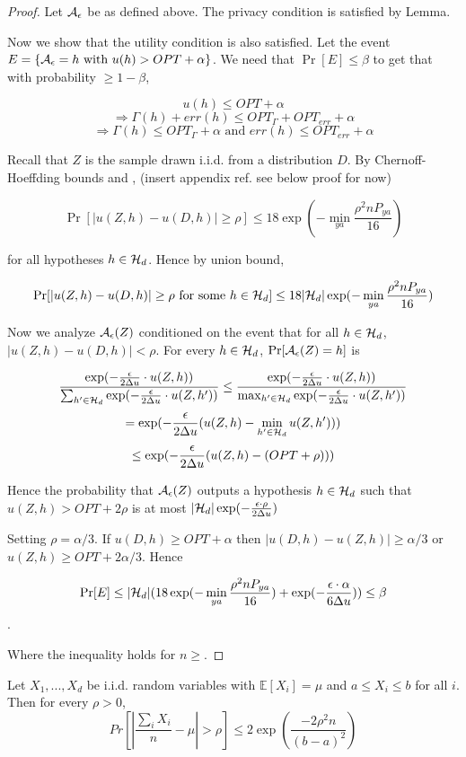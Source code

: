 \begin{proof}
	Let $\mathcal{A}_{\epsilon}$ be as defined above. The privacy condition is
	satisfied by Lemma.

	Now we show that the utility condition is also satisfied. Let the
	event $E = \{\mathcal{A}_{\epsilon} = h \text{ with } u(h) > OPT + \alpha\}$.
	We need that $\Pr[E] \leq \beta$ to get that with probability $\geq 1-\beta$,

	$$u(h) \leq OPT + \alpha$$
	$$\Rightarrow \Gamma(h) + err(h) \leq OPT_\Gamma + OPT_{err} +\alpha$$
	$$\Rightarrow \Gamma(h) \leq OPT_\Gamma +\alpha \text{ and } err(h) \leq OPT_{err} +\alpha$$

	Recall that $Z$ is the sample drawn i.i.d. from a distribution $D$.
	By Chernoff-Hoeffding bounds and \cite{woodworthFollowUp}, (insert appendix ref. see below proof
	for now)

	$$\Pr[|u(Z,h) - u(D,h)| \geq \rho] \leq 18\exp(-\min_{ya}{\frac{\rho^2 n P_{ya}}{16}})$$

	for all hypotheses $h \in \mathcal{H}_d$. Hence by union bound,

	$$\Pr[|u(Z,h) - u(D,h)| \geq \rho \text{ for some } h \in \mathcal{H}_d] \leq 18|\mathcal{H}_d|\exp(-\min_{ya}{\frac{\rho^2 n P_{ya}}{16}})$$

	Now we analyze $\mathcal{A}_\epsilon(Z)$ conditioned on the event that for all
	$h\in \mathcal{H}_d$, $|u(Z,h) - u(D,h)| < \rho$. For every $h \in \mathcal{H}_d$, $\Pr[\mathcal{A}_\epsilon(Z) = h]$ is

	$$\frac{\exp(-\frac{\epsilon}{2\Delta u} \cdot
		u(Z,h))}{\sum_{h'\in\mathcal{H}_d}\exp(-\frac{\epsilon}{2\Delta u} \cdot u(Z,h'))}
	\leq \frac{\exp(-\frac{\epsilon}{2\Delta u} \cdot
		u(Z,h))}{\max_{h'\in\mathcal{H}_d}\exp(-\frac{\epsilon}{2\Delta u} \cdot u(Z,h'))} $$
	$$= \exp(-\frac{\epsilon}{2\Delta u}(u(Z,h) - \min_{h'\in\mathcal{H}_d}u(Z,h')))$$
	$$\leq \exp(-\frac{\epsilon}{2\Delta u}(u(Z,h) - (OPT + \rho)))$$

	Hence the probability that $\mathcal{A}_\epsilon(Z)$ outputs a hypothesis $h \in
	\mathcal{H}_d$ such that $u(Z,h) > OPT + 2\rho$ is at most
	$|\mathcal{H}_d|\exp(-\frac{\epsilon\cdot\rho}{2\Delta u})$

	Setting $\rho = \alpha/3$. If $u(D,h) \geq OPT + \alpha$ then
	$|u(D,h) - u(Z,h)| \geq \alpha/3$ or $u(Z,h) \geq OPT + 2\alpha/3$.
	Hence

	$$\Pr[E] \leq |\mathcal{H}_d|(18\exp(-\min_{ya}{\frac{\rho^2 n P_{ya}}{16}}) + \exp(-\frac{\epsilon\cdot\alpha}{6\Delta u})) \leq \beta$$.

	Where the inequality holds for $n \geq $.
\end{proof}
\begin{theorem}
	Let $X_1,...,X_d$ be i.i.d. random variables with $\mathbb{E}[X_i] = \mu$ and $a \leq X_i \leq b$ for all $i$. Then for every $\rho > 0$,
	$$Pr[|\frac{\sum_i X_i}{n} - \mu| > \rho] \leq 2\exp(\frac{-2\rho^2n}{(b-a)^2})$$
\end{theorem}

